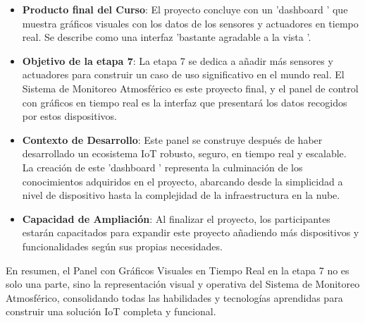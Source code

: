 \documentclass{report}
\begin{document}
\begin{itemize}
    \item \textbf{Producto final del Curso}: El proyecto concluye con un  'dashboard ' que muestra gráficos visuales con los datos de los sensores y actuadores 
    en tiempo real. Se describe como una interfaz  'bastante agradable a la vista '.
    \item \textbf{Objetivo de la etapa 7}: La etapa 7 se dedica a añadir más sensores y actuadores para construir un caso de uso significativo en el 
    mundo real. El Sistema de Monitoreo Atmosférico es este proyecto final, y el panel de control con gráficos en tiempo real es la interfaz que presentará 
    los datos recogidos por estos dispositivos.
    \item \textbf{Contexto de Desarrollo}: Este panel se construye después de haber desarrollado un ecosistema IoT robusto, seguro, en tiempo real y escalable. 
    La creación de este  'dashboard ' representa la culminación de los conocimientos adquiridos en el proyecto, abarcando desde la simplicidad a nivel de 
    dispositivo hasta la complejidad de la infraestructura en la nube.
    \item \textbf{Capacidad de Ampliación}: Al finalizar el proyecto, los participantes estarán capacitados para expandir este proyecto añadiendo más 
    dispositivos y funcionalidades según sus propias necesidades.
\end{itemize}
En resumen, el Panel con Gráficos Visuales en Tiempo Real en la etapa 7 no es solo una parte, sino la representación visual y operativa del Sistema de 
Monitoreo Atmosférico, consolidando todas las habilidades y tecnologías aprendidas para construir una solución IoT completa y funcional.
\end{document}
